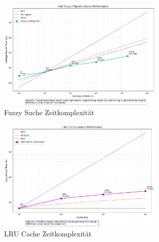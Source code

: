 \begin{figure}[htbp]
  \centering
  \includegraphics[width=0.7\textwidth]{./search_engine_images/fast_fuzzy.png}
  \caption{Fuzzy Suche Zeitkomplexität}
  \label{fig:fuzzy_time_complexity}
\end{figure}

\begin{figure}[htbp]
  \centering
  \includegraphics[width=0.7\textwidth]{./search_engine_images/lru_cache.png}
  \caption{LRU Cache Zeitkomplexität}
  \label{fig:lru_time_complexity}
\end{figure}

